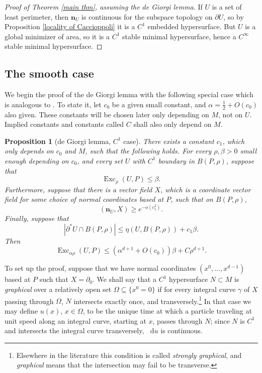 \documentclass[reqno,11pt]{amsart}
\DeclareMathOperator{\Exc}{Exc}
\newcommand*\dif{\mathop{}\!\mathrm{d}}
\newcommand{\normal}{\mathbf n}
\newcommand{\dfn}[1]{\emph{#1}\index{#1}}
\newtheorem{proposition}[theorem]{Proposition}
\theoremstyle{definition}
\numberwithin{equation}{section}
\begin{document}
\begin{proof}[Proof of Theorem \ref{main thm}, assuming the de Giorgi lemma]
If $U$ is a set of least perimeter, then $\normal_U$ is continuous for the subspace topology on $\partial U$, so by Proposition \ref{locality of Caccioppoli} it is a $C^1$ embedded hypersurface.
But $U$ is a global minimizer of area, so it is a $C^1$ stable minimal hypersurface, hence a $C^\infty$ stable minimal hypersurface.
\end{proof}

\subsection{The smooth case}
We begin the proof of the de Giorgi lemma with the following special case which is analogous to \cite[Lemma 6.4]{Giusti77}.
To state it, let $c_0$ be a given small constant, and $\alpha = \frac{1}{2} + O(c_0)$ also given.
These constants will be chosen later only depending on $M$, not on $U$.
Implied constants and constants called $C$ shall also only depend on $M$.

\begin{proposition}[de Giorgi lemma, $C^1$ case]\label{Miranda44}
There exists a constant $c_1$, which only depends on $c_0$ and $M$, such that the following holds.
For every $\rho, \beta > 0$ small enough depending on $c_0$, and every set $U$ with $C^1$ boundary in $B(P, \rho)$, suppose that 
$$\Exc_\rho(U, P) \leq \beta.$$
Furthermore, suppose that there is a vector field $X$, which is a coordinate vector field for some choice of normal coordinates based at $P$, such that on $B(P, \rho)$,
\begin{equation}
    (\normal_U, X) \geq e^{-o(c_1^2)}. \label{Miranda44 normal hyp}
\end{equation}
Finally, suppose that
\begin{equation}
|\partial^* U \cap B(P, \rho)| \leq \eta(U, B(P, \rho)) + c_1 \beta. \label{Miranda44 minimality hyp}
\end{equation}
Then
\begin{equation}\label{Miranda44 concl}
\Exc_{\alpha \rho} (U, P) \leq (\alpha^{d + 1} + O(c_0)) \beta + C\rho^{d + 1}.
\end{equation}
\end{proposition}

To set up the proof, suppose that we have normal coordinates $(x^0, \dots, x^{d - 1})$ based at $P$ such that $X = \partial_0$.
We shall say that a $C^1$ hypersurface $N \subset M$ is \dfn{graphical} over a relatively open set $\Omega \subseteq \{x^0 = 0\}$ if for every integral curve $\gamma$ of $X$ passing through $\Omega$, $N$ intersects exactly once, and transversely.\footnote{Elsewhere in the literature this condition is called \dfn{strongly graphical}, and \dfn{graphical} means that the intersection may fail to be transverse.}
In that case we may define $u(x)$, $x \in \Omega$, to be the unique time at which a particle traveling at unit speed along an integral curve, starting at $x$, passes through $N$; since $N$ is $C^1$ and intersects the integral curve transversely, $\dif u$ is continuous.
\end{document}
